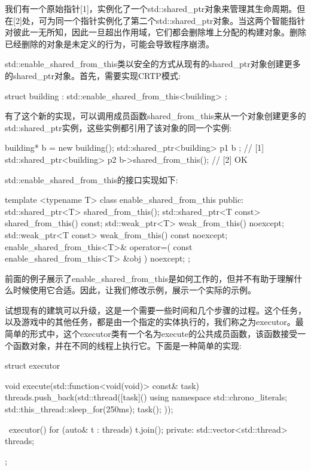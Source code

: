 我们有一个原始指针[1]，实例化了一个std::shared\_ptr对象来管理其生命周期。但在[2]处，可为同一个指针实例化了第二个std::shared\_ptr对象。当这两个智能指针对彼此一无所知，因此一旦超出作用域，它们都会删除堆上分配的构建对象。删除已经删除的对象是未定义的行为，可能会导致程序崩溃。

std::enable\_shared\_from\_this类以安全的方式从现有的shared\_ptr对象创建更多的shared\_ptr对象。首先，需要实现CRTP模式:

\begin{cpp}
struct building : std::enable_shared_from_this<building>
{
};
\end{cpp}

有了这个新的实现，可以调用成员函数shared\_from\_this来从一个对象创建更多的std::shared\_ptr实例，这些实例都引用了该对象的同一个实例:

\begin{cpp}
building* b = new building();
std::shared_ptr<building> p1{ b }; // [1]
std::shared_ptr<building> p2{
	b->shared_from_this()}; // [2] OK
\end{cpp}

std::enable\_shared\_from\_this的接口实现如下:

\begin{cpp}
template <typename T>
class enable_shared_from_this
{
	public:
	std::shared_ptr<T> shared_from_this();
	std::shared_ptr<T const> shared_from_this() const;
	std::weak_ptr<T> weak_from_this() noexcept;
	std::weak_ptr<T const> weak_from_this() const noexcept;
	enable_shared_from_this<T>& operator=(
		const enable_shared_from_this<T> &obj ) noexcept;
};
\end{cpp}

前面的例子展示了enable\_shared\_from\_this是如何工作的，但并不有助于理解什么时候使用它合适。因此，让我们修改示例，展示一个实际的示例。

试想现有的建筑可以升级，这是一个需要一些时间和几个步骤的过程。这个任务，以及游戏中的其他任务，都是由一个指定的实体执行的，我们称之为executor。最简单的形式中，这个executor类有一个名为execute的公共成员函数，该函数接受一个函数对象，并在不同的线程上执行它。下面是一种简单的实现:

\begin{cpp}
struct executor
{
	void execute(std::function<void(void)> const& task)
	{
		threads.push_back(std::thread([task]() {
			using namespace std::chrono_literals;
			std::this_thread::sleep_for(250ms);
			task();
		}));
	}

	~executor()
	{
		for (auto& t : threads)
		t.join();
	}
private:
	std::vector<std::thread> threads;
};
\end{cpp}

